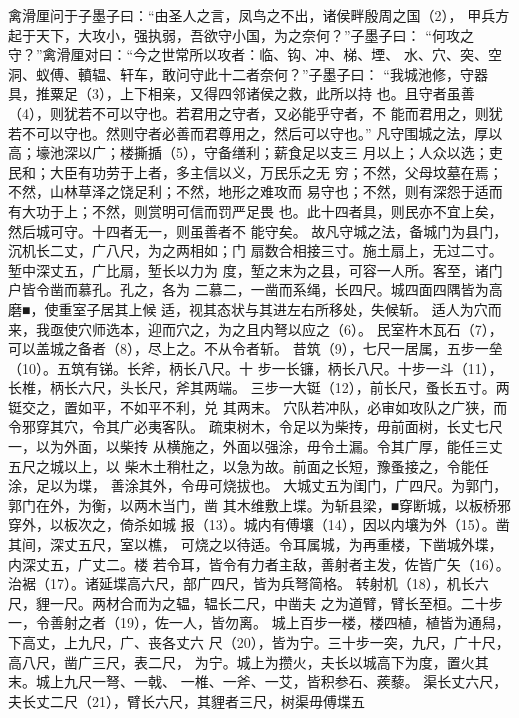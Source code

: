 \documentclass[12pt,UTF8]{ctexbook}
\begin{document}
禽滑厘问于子墨子曰：“由圣人之言，凤鸟之不出，诸侯畔殷周之国（2）， 
甲兵方起于天下，大攻小，强执弱，吾欲守小国，为之奈何？”子墨子曰： 
“何攻之守？”禽滑厘对曰：“今之世常所以攻者：临、钩、冲、梯、堙、 
水、穴、突、空洞、蚁傅、轒辒、轩车，敢问守此十二者奈何？”子墨子曰： 
“我城池修，守器具，推粟足（3），上下相亲，又得四邻诸侯之救，此所以持 
也。且守者虽善（4），则犹若不可以守也。若君用之守者，又必能乎守者，不 
能而君用之，则犹若不可以守也。然则守者必善而君尊用之，然后可以守也。” 
凡守围城之法，厚以高；壕池深以广；楼撕揗（5），守备缮利；薪食足以支三 
月以上；人众以选；吏民和；大臣有功劳于上者，多主信以义，万民乐之无 
穷；不然，父母坟墓在焉；不然，山林草泽之饶足利；不然，地形之难攻而 
易守也；不然，则有深怨于适而有大功于上；不然，则赏明可信而罚严足畏 
也。此十四者具，则民亦不宜上矣，然后城可守。十四者无一，则虽善者不 
能守矣。 
故凡守城之法，备城门为县门，沉机长二丈，广八尺，为之两相如；门 
扇数合相接三寸。施土扇上，无过二寸。堑中深丈五，广比扇，堑长以力为 
度，堑之末为之县，可容一人所。客至，诸门户皆令凿而慕孔。孔之，各为 
二慕二，一凿而系绳，长四尺。城四面四隅皆为高磨■，使重室子居其上候 
适，视其态状与其进左右所移处，失候斩。 
适人为穴而来，我亟使穴师选本，迎而穴之，为之且内弩以应之（6）。 
民室杵木瓦石（7），可以盖城之备者（8），尽上之。不从令者斩。 
昔筑（9），七尺一居属，五步一垒（10）。五筑有锑。长斧，柄长八尺。十 
步一长镰，柄长八尺。十步一斗（11），长椎，柄长六尺，头长尺，斧其两端。 
三步一大铤（12），前长尺，蚤长五寸。两铤交之，置如平，不如平不利，兑 
其两末。 
穴队若冲队，必审如攻队之广狭，而令邪穿其穴，令其广必夷客队。 
疏束树木，令足以为柴抟，毋前面树，长丈七尺一，以为外面，以柴抟 
从横施之，外面以强涂，毋令土漏。令其广厚，能任三丈五尺之城以上，以 
柴木土稍杜之，以急为故。前面之长短，豫蚤接之，令能任涂，足以为堞， 
善涂其外，令毋可烧拔也。 
大城丈五为闺门，广四尺。为郭门，郭门在外，为衡，以两木当门，凿 
其木维敷上堞。为斩县梁，■穿断城，以板桥邪穿外，以板次之，倚杀如城 
报（13）。城内有傅壤（14），因以内壤为外（15）。凿其间，深丈五尺，室以樵， 
可烧之以待适。令耳属城，为再重楼，下凿城外堞，内深丈五，广丈二。楼 
若令耳，皆令有力者主敌，善射者主发，佐皆广矢（16）。 
治裾（17）。诸延堞高六尺，部广四尺，皆为兵弩简格。 
转射机（18），机长六尺，貍一尺。两材合而为之辒，辒长二尺，中凿夫 
之为道臂，臂长至桓。二十步一，令善射之者（19），佐一人，皆勿离。 
城上百步一楼，楼四植，植皆为通舄，下高丈，上九尺，广、丧各丈六 
尺（20），皆为宁。三十步一突，九尺，广十尺，高八尺，凿广三尺，表二尺， 
为宁。城上为攒火，夫长以城高下为度，置火其末。城上九尺一弩、一戟、 
一椎、一斧、一艾，皆积参石、蒺藜。 
渠长丈六尺，夫长丈二尺（21），臂长六尺，其貍者三尺，树渠毋傅堞五 
\end{document}
